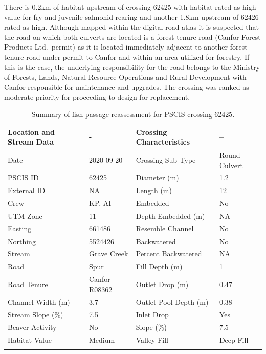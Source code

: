 \documentclass[
]{book}
\begin{document}
There is 0.2km of habitat upstream of crossing 62425 with habitat rated as high value for fry and juvenile salmonid rearing and another 1.8km upstream of 62426 rated as high. Although mapped within the digital road atlas it is suspected that the road on which both culverts are located is a forest tenure road (Canfor Forest Products Ltd.~permit) as it is located immediately adjacent to another forest tenure road under permit to Canfor and within an area utilized for forestry. If this is the case, the underlying responsibility for the road belongs to the Ministry of Forests, Lands, Natural Resource Operations and Rural Development with Canfor responsible for maintenance and upgrades. The crossing was ranked as moderate priority for proceeding to design for replacement.

\begin{table}

\caption{\label{tab:tab-culvert-62425}Summary of fish passage reassessment for PSCIS crossing 62425.}
\centering
\fontsize{11}{13}\selectfont
\begin{tabu} to 
\toprule
Location and Stream Data & - & Crossing Characteristics & --\\
\midrule
Date & 2020-09-20 & Crossing Sub Type & Round Culvert\\
PSCIS ID & 62425 & Diameter (m) & 1.2\\
External ID & NA & Length (m) & 12\\
Crew & KP, AI & Embedded & No\\
UTM Zone & 11 & Depth Embedded (m) & NA\\
\addlinespace
Easting & 661486 & Resemble Channel & No\\
Northing & 5524426 & Backwatered & No\\
Stream & Grave Creek & Percent Backwatered & NA\\
Road & Spur & Fill Depth (m) & 1\\
Road Tenure & Canfor R08362 & Outlet Drop (m) & 0.47\\
\addlinespace
Channel Width (m) & 3.7 & Outlet Pool Depth (m) & 0.38\\
Stream Slope (\%) & 7.5 & Inlet Drop & Yes\\
Beaver Activity & No & Slope (\%) & 7.5\\
Habitat Value & Medium & Valley Fill & Deep Fill\\
\bottomrule
{}\\
\end{tabu}
\end{table}
\end{document}
